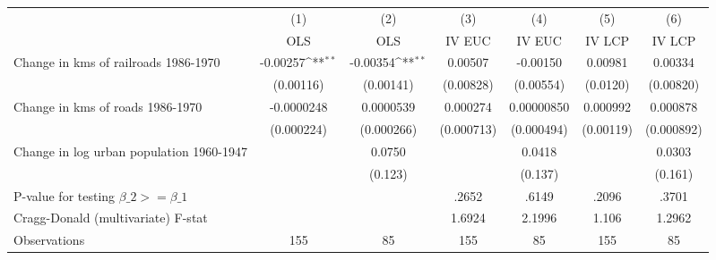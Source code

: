 {
\def\sym#1{\ifmmode^{#1}\else\(^{#1}\)\fi}
\begin{tabular}{l*{6}{c}}
\hline\hline
                &\multicolumn{1}{c}{(1)}&\multicolumn{1}{c}{(2)}&\multicolumn{1}{c}{(3)}&\multicolumn{1}{c}{(4)}&\multicolumn{1}{c}{(5)}&\multicolumn{1}{c}{(6)}\\
                &\multicolumn{1}{c}{OLS}&\multicolumn{1}{c}{OLS}&\multicolumn{1}{c}{IV EUC}&\multicolumn{1}{c}{IV EUC}&\multicolumn{1}{c}{IV LCP}&\multicolumn{1}{c}{IV LCP}\\
\hline
Change in kms of railroads 1986-1970& -0.00257\sym{**} & -0.00354\sym{**} &  0.00507         & -0.00150         &  0.00981         &  0.00334         \\
                &(0.00116)         &(0.00141)         &(0.00828)         &(0.00554)         & (0.0120)         &(0.00820)         \\
[1em]
Change in kms of roads 1986-1970&-0.0000248         &0.0000539         & 0.000274         &0.00000850         & 0.000992         & 0.000878         \\
                &(0.000224)         &(0.000266)         &(0.000713)         &(0.000494)         &(0.00119)         &(0.000892)         \\
[1em]
Change in log urban population 1960-1947&                  &   0.0750         &                  &   0.0418         &                  &   0.0303         \\
                &                  &  (0.123)         &                  &  (0.137)         &                  &  (0.161)         \\
\hline
P-value for testing $\beta\_{2} >= \beta\_{1}$&                  &                  &    .2652         &    .6149         &    .2096         &    .3701         \\
Cragg-Donald (multivariate) F-stat&                  &                  &   1.6924         &   2.1996         &    1.106         &   1.2962         \\
Observations    &      155         &       85         &      155         &       85         &      155         &       85         \\
\hline\hline
\end{tabular}
}
